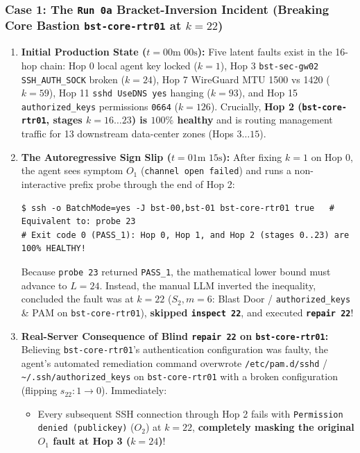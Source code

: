 \documentclass[11pt,a4paper]{article}
\theoremstyle{definition}
\theoremstyle{remark}
\begin{document}
\subsubsection*{Case 1: The \texttt{Run 0a} Bracket-Inversion Incident (Breaking Core Bastion \texttt{bst-core-rtr01} at $k=22$)}
\begin{enumerate}[leftmargin=1.6em]
    \item \textbf{Initial Production State ($t = 00\text{m }00\text{s}$):} Five latent faults exist in the 16-hop chain: Hop 0 local agent key locked ($k=1$), Hop 3 \texttt{bst-sec-gw02} \texttt{SSH\_AUTH\_SOCK} broken ($k=24$), Hop 7 WireGuard MTU 1500 vs 1420 ($k=59$), Hop 11 \texttt{sshd UseDNS yes} hanging ($k=93$), and Hop 15 \texttt{authorized\_keys} permissions \texttt{0664} ($k=126$). Crucially, \textbf{Hop 2 (\texttt{bst-core-rtr01}, stages $k=16\dots 23$) is $100\%$ healthy} and is routing management traffic for 13 downstream data-center zones (Hops $3 \dots 15$).
    \item \textbf{The Autoregressive Sign Slip ($t = 01\text{m }15\text{s}$):} After fixing $k=1$ on Hop 0, the agent sees symptom $O_1$ (\texttt{channel open failed}) and runs a non-interactive prefix probe through the end of Hop 2:
    \begin{lstlisting}[style=c99style]
$ ssh -o BatchMode=yes -J bst-00,bst-01 bst-core-rtr01 true   # Equivalent to: probe 23
# Exit code 0 (PASS_1): Hop 0, Hop 1, and Hop 2 (stages 0..23) are 100% HEALTHY!
    \end{lstlisting}
    Because \texttt{probe 23} returned \texttt{PASS\_1}, the mathematical lower bound must advance to $L = 24$. Instead, the manual LLM inverted the inequality, concluded the fault was at $k=22$ ($S_2, m=6$: Blast Door / \texttt{authorized\_keys} \& PAM on \texttt{bst-core-rtr01}), \textbf{skipped \texttt{inspect 22}}, and executed \textbf{\texttt{repair 22}}!
    \item \textbf{Real-Server Consequence of Blind \texttt{repair 22} on \texttt{bst-core-rtr01}:}
    Believing \texttt{bst-core-rtr01}'s authentication configuration was faulty, the agent's automated remediation command overwrote \texttt{/etc/pam.d/sshd} / \texttt{\textasciitilde/.ssh/authorized\_keys} on \texttt{bst-core-rtr01} with a broken configuration (flipping $s_{22} : 1 \to 0$). Immediately:
    \begin{itemize}
        \item Every subsequent SSH connection through Hop 2 fails with \texttt{Permission denied (publickey)} ($O_2$) at $k=22$, \textbf{completely masking the original $O_1$ fault at Hop 3 ($k=24$)}!

\end{itemize}
\end{enumerate}
\end{document}
